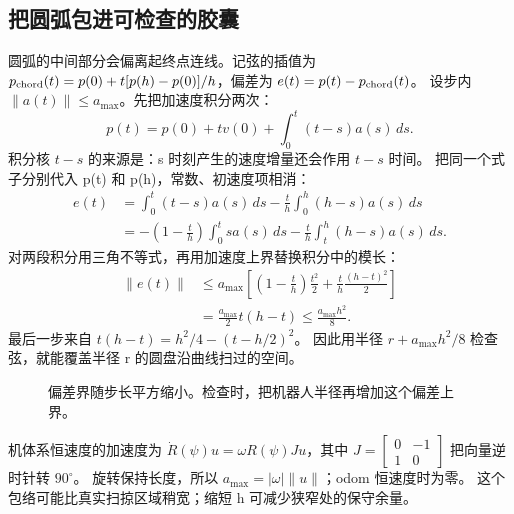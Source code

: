 \subsection*{把圆弧包进可检查的胶囊}
圆弧的中间部分会偏离起终点连线。记弦的插值为
$p_{\rm chord}(t)=p(0)+t[p(h)-p(0)]/h$，偏差为 $e(t)=p(t)-p_{\rm chord}(t)$。
设步内 $\|a(t)\|\leq a_{\max}$。先把加速度积分两次：
\begin{equation}
p(t)=p(0)+tv(0)+\int_0^t(t-s)a(s)\,ds.
\end{equation}
积分核 $t-s$ 的来源是：s 时刻产生的速度增量还会作用 $t-s$ 时间。
把同一个式子分别代入 p(t) 和 p(h)，常数、初速度项相消：
\begin{align}
e(t)&=\int_0^t(t-s)a(s)\,ds-\frac th\int_0^h(h-s)a(s)\,ds\\
 &=-\left(1-\frac th\right)\int_0^t s a(s)\,ds
   -\frac th\int_t^h(h-s)a(s)\,ds.
\end{align}
对两段积分用三角不等式，再用加速度上界替换积分中的模长：
\begin{align}
\|e(t)\|&\leq a_{\max}\left[\left(1-\frac th\right)\frac{t^2}{2}
 +\frac th\frac{(h-t)^2}{2}\right]\\
 &=\frac{a_{\max}}2t(h-t)\leq\frac{a_{\max}h^2}{8}.
\end{align}
最后一步来自 $t(h-t)=h^2/4-(t-h/2)^2$。
因此用半径 $r+a_{\max}h^2/8$ 检查弦，就能覆盖半径 r 的圆盘沿曲线扫过的空间。

\begin{figure}[ht]
\centering
{}
\caption{偏差界随步长平方缩小。检查时，把机器人半径再增加这个偏差上界。}
\end{figure}

机体系恒速度的加速度为 $\dot R(\psi)u=\omega R(\psi)Ju$，其中
$J=\begin{bmatrix}0&-1\\1&0\end{bmatrix}$ 把向量逆时针转 $90^\circ$。
旋转保持长度，所以 $a_{\max}=|\omega|\|u\|$；odom 恒速度时为零。
这个包络可能比真实扫掠区域稍宽；缩短 h 可减少狭窄处的保守余量。


